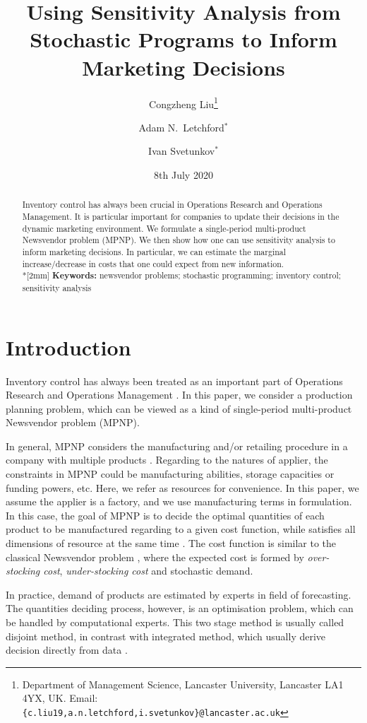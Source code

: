 \documentclass[a4paper,11pt]{article}
\title{Using Sensitivity Analysis from Stochastic Programs to Inform Marketing Decisions}
\author{Congzheng Liu\thanks{Department of Management Science,
Lancaster University, Lancaster LA1 4YX, UK.
Email: {\tt \{c.liu19,a.n.letchford,i.svetunkov\}@lancaster.ac.uk}}
\and Adam N.\ Letchford$^*$ \and Ivan Svetunkov$^*$} %
\date{8th July 2020}
\begin{document}
\maketitle

\begin{abstract}
Inventory control has always been crucial in Operations Research and Operations Management. It is particular important for companies to update their decisions in the dynamic marketing environment. 
We formulate a single-period multi-product Newsvendor problem (MPNP). We then show how one can use sensitivity analysis to inform marketing decisions. In particular, we can estimate the marginal increase/decrease in
costs that one could expect from new information.
\\*[2mm]
{\bf Keywords:} newsvendor problems; stochastic programming; inventory control; sensitivity analysis
\end{abstract}

\section{Introduction}
Inventory control has always been treated as an important part of Operations Research and Operations Management \cite{Po02,SPP98,Zi00}. In this paper, we consider a production planning problem, which can be viewed as a kind of single-period multi-product
Newsvendor problem (MPNP)\cite{D98,TTV12}.

In general, MPNP considers the manufacturing and/or retailing procedure in a company with multiple products \cite{SPP98}. Regarding to the natures of applier, the constraints in MPNP could be manufacturing abilities, storage capacities or funding powers, etc. Here, we refer as resources for convenience. In this paper, we assume the applier is a factory, and we use manufacturing terms in formulation. In this case, the goal of MPNP is to decide the optimal quantities of each product to be manufactured regarding to a given cost function, while satisfies all dimensions of resource at the same time \cite{BDR12}. The cost function is similar to the classical Newsvendor problem \cite{Ch12}, where the expected cost is formed by \emph{over-stocking cost}, \emph{under-stocking cost} and stochastic demand.

In practice, demand of products are estimated by experts in field of forecasting. The quantities deciding process, however, is an optimisation problem, which can be handled by computational experts. This two stage method is usually called disjoint method, in contrast with integrated method, which usually derive decision directly from data \cite{Sc58}. 
\end{document}
